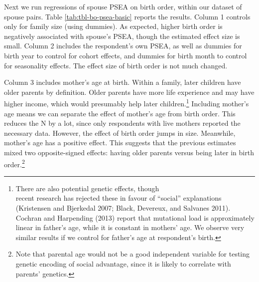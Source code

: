 \documentclass[
]{article}
\begin{document}
 

Next we run regressions of spouse PSEA on birth order, within our
dataset of spouse pairs. Table \ref{tab:tbl-bo-psea-basic} reports the
results. Column 1 controls only for family size (using dummies). As
expected, higher birth order is negatively associated with spouse's
PSEA, though the estimated effect size is small. Column 2 includes the
respondent's own PSEA, as well as dummies for birth year to control for
cohort effects, and dummies for birth month to control for seasonality
effects. The effect size of birth order is not much changed.

Column 3 includes mother's age at birth. Within a family, later children
have older parents by definition. Older parents have more life
experience and may have higher income, which would presumably help later
children.\footnote{There are also potential genetic effects, though\\
  recent research has rejected these in favour of ``social''
  explanations (Kristensen and Bjerkedal 2007; Black, Devereux, and Salvanes 2011).\\
  Cochran and Harpending (2013) report that mutational load is approximately
  linear in father's age, while it is constant in mothers' age. We
  observe very similar results if we control for father's age at
  respondent's birth.} Including mother's age means we can separate the effect
of mother's age from birth order. This reduces the N by a lot, since
only respondents with live mothers reported the necessary data. However,
the effect of birth order jumps in size. Meanwhile, mother's age has a
positive effect. This suggests that the previous estimates mixed two
opposite-signed effects: having older parents versus being later in
birth order.\footnote{Note that parental age would not be a good independent variable
  for testing genetic encoding of social advantage, since it is likely
  to correlate with parents' genetics.}

 
  \providecommand{\huxb}[2]{\arrayrulecolor[RGB]{#1}\global\arrayrulewidth=#2pt}
  \providecommand{\huxvb}[2]{\color[RGB]{#1}\vrule width #2pt}
  \providecommand{\huxtpad}[1]{\rule{0pt}{#1}}
  \providecommand{\huxbpad}[1]{\rule[-#1]{0pt}{#1}}
\end{document}
